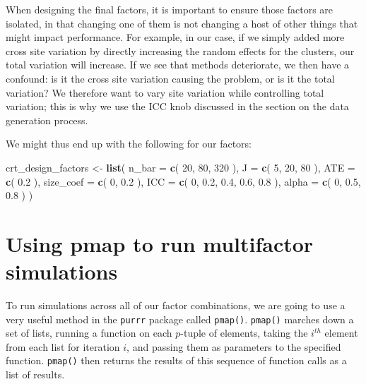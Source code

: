 \documentclass[
]{book}
\newenvironment{Shaded}{\begin{snugshade}}{\end{snugshade}}
\newcommand{\AttributeTok}[1]{\textcolor[rgb]{0.13,0.29,0.53}{#1}}
\newcommand{\DecValTok}[1]{\textcolor[rgb]{0.00,0.00,0.81}{#1}}
\newcommand{\FloatTok}[1]{\textcolor[rgb]{0.00,0.00,0.81}{#1}}
\newcommand{\FunctionTok}[1]{\textcolor[rgb]{0.13,0.29,0.53}{\textbf{#1}}}
\newcommand{\NormalTok}[1]{#1}
\newcommand{\OtherTok}[1]{\textcolor[rgb]{0.56,0.35,0.01}{#1}}
\begin{document}
When designing the final factors, it is important to ensure those factors are isolated, in that changing one of them is not changing a host of other things that might impact performance.
For example, in our case, if we simply added more cross site variation by directly increasing the random effects for the clusters, our total variation will increase.
If we see that methods deteriorate, we then have a confound: is it the cross site variation causing the problem, or is it the total variation?
We therefore want to vary site variation while controlling total variation; this is why we use the ICC knob discussed in the section on the data generation process.

We might thus end up with the following for our factors:

\begin{Shaded}
\begin{Highlighting}[]
\NormalTok{crt\_design\_factors }\OtherTok{\textless{}{-}} \FunctionTok{list}\NormalTok{(}
  \AttributeTok{n\_bar =} \FunctionTok{c}\NormalTok{( }\DecValTok{20}\NormalTok{, }\DecValTok{80}\NormalTok{, }\DecValTok{320}\NormalTok{ ),}
  \AttributeTok{J =} \FunctionTok{c}\NormalTok{( }\DecValTok{5}\NormalTok{, }\DecValTok{20}\NormalTok{, }\DecValTok{80}\NormalTok{ ),}
  \AttributeTok{ATE =} \FunctionTok{c}\NormalTok{( }\FloatTok{0.2}\NormalTok{ ),}
  \AttributeTok{size\_coef =} \FunctionTok{c}\NormalTok{( }\DecValTok{0}\NormalTok{, }\FloatTok{0.2}\NormalTok{ ),}
  \AttributeTok{ICC =} \FunctionTok{c}\NormalTok{( }\DecValTok{0}\NormalTok{, }\FloatTok{0.2}\NormalTok{, }\FloatTok{0.4}\NormalTok{, }\FloatTok{0.6}\NormalTok{, }\FloatTok{0.8}\NormalTok{ ),}
  \AttributeTok{alpha =} \FunctionTok{c}\NormalTok{( }\DecValTok{0}\NormalTok{, }\FloatTok{0.5}\NormalTok{, }\FloatTok{0.8}\NormalTok{ )}
\NormalTok{)}
\end{Highlighting}
\end{Shaded}

\section{Using pmap to run multifactor simulations}\label{using-pmap-to-run-multifactor-simulations}

To run simulations across all of our factor combinations, we are going to use a very useful method in the \texttt{purrr} package called \texttt{pmap()}.
\texttt{pmap()} marches down a set of lists, running a function on each \(p\)-tuple of elements, taking the \(i^{th}\) element from each list for iteration \(i\), and passing them as parameters to the specified function.
\texttt{pmap()} then returns the results of this sequence of function calls as a list of results.
\end{document}
